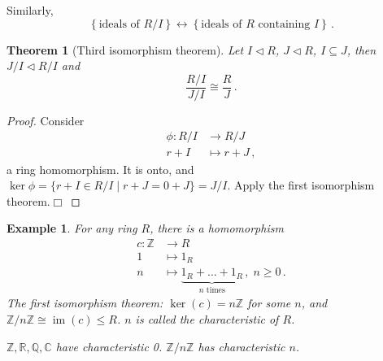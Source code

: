 \documentclass{article}
\theoremstyle{plain}\theoremheaderfont{\normalfont\itshape}\theorembodyfont{\rmfamily}\theoremseparator{.}\newtheorem*{rem}{Remark}\newtheorem*{ex}{Example}\newtheorem*{proof}{Proof}\newtheorem*{altp}{Alternative proof}\newtheorem*{nonex}{Non-Example}
\theoremstyle{plain}\theoremheaderfont{\normalfont\bfseries}\theorembodyfont{\rmfamily}\theoremseparator{.}\newtheorem{thm}{Theorem}[section]\newtheorem{lem}[thm]{Lemma}\newtheorem{prop}[thm]{Proposition}\newtheorem*{cor}{Corollary}\newtheorem{defn}[thm]{Definition}\newtheorem{clm}[thm]{Claim}\newtheorem{clminproof}{Claim}\newtheorem*{notn}{Notation}\newtheorem*{exer}{Exercise}\newtheorem*{lemnn}{Lemma}
\theoremstyle{break}\theoremheaderfont{\normalfont\itshape}\theorembodyfont{\rmfamily}\theoremseparator{.\medskip}\newtheorem*{proofskip}{Proof}\newtheorem*{exs}{Examples}\newtheorem*{rems}{Remarks}\newtheorem*{obs}{Observations}
\theoremstyle{break}\theoremheaderfont{\normalfont\bfseries}\theorembodyfont{\rmfamily}\theoremseparator{.\medskip}\newtheorem{lemskip}[thm]{Lemma}\newtheorem{defnskip}[thm]{Definition}\newtheorem{propskip}[thm]{Proposition}\newtheorem{thmskip}[thm]{Theorem}
\numberwithin{equation}{section}
\newcommand{\qed}{\hfill\ensuremath{\Box}}
\DeclareMathOperator*{\im}{im}
\newcommand{\ZZ}{\mathbb{Z}}
\newcommand{\QQ}{\mathbb{Q}}
\newcommand{\RR}{\mathbb{R}}
\newcommand{\CC}{\mathbb{C}}
\begin{document}
    Similarly,
    \[\left\{\text{ideals of }R/I \right\}\longleftrightarrow\left\{\text{ideals of } R \text{ containing }I\right\}\,.\]
    \begin{thm}[Third isomorphism theorem]
        Let \(I\lhd R\), \(J\lhd R\), \(I\subseteq J\), then \(J/I\lhd R/I\) and
        \[\frac{R/I}{J/I}\cong\frac{R}{J}\,.\]
    \end{thm}
    \begin{proof}
        Consider
        \begin{align*}
            \phi:R/I&\longrightarrow R/J\\
            r+I&\longmapsto r+J\,,
        \end{align*}
        a ring homomorphism. It is onto, and \(\ker\phi=\{r+I\in R/I\mid r+J=0+J\}=J/I\). Apply the first isomorphism theorem.\qed
    \end{proof}
    \begin{ex}
        For any ring \(R\), there is a homomorphism
        \begin{align*}
            c:\ZZ&\longrightarrow R\\
            1&\longmapsto 1_R\\
            n&\longmapsto \underbrace{1_R+\dots+1_R}_{n\text{ times}}\,,\;n\ge 0\,.
        \end{align*}
        The first isomorphism theorem: \(\ker(c)=n\ZZ\) for some \(n\), and \(\ZZ/n\ZZ\cong\im(c)\le R\). \(n\) is called the \textit{characteristic} of \(R\).

        \(\ZZ,\RR,\QQ,\CC\) have characteristic 0. \(\ZZ/n\ZZ\) has characteristic \(n\).
    \end{ex}
\end{document}
